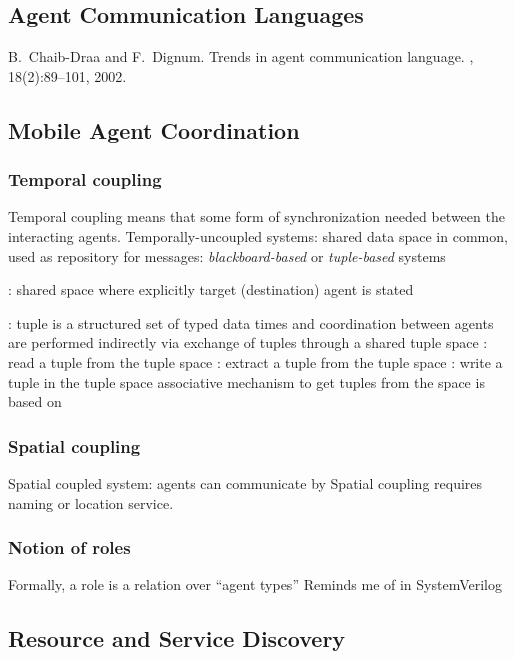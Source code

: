 \documentclass{myproc}
\begin{document}
\subsection{\textcolor{red2}{\bf{}Agent Communication Languages}}
\bit
\w B.~Chaib-Draa and F.~Dignum.
\newblock Trends in agent communication language.
, 18(2):89--101, 2002.
\eit

\subsection{\textcolor{red2}{\bf{}Mobile Agent Coordination}}
\subsubsection{Temporal coupling}
\bit
\w Temporal coupling means that some form of synchronization needed between
the interacting agents.
\w Temporally-uncoupled systems: shared data space in common, used as
repository for messages: {\em blackboard-based\/} or {\em tuple-based\/}
systems 

\w {}: shared space where explicitly target
  (destination) agent is stated

\w {}:  tuple is a structured set of
  typed data times and coordination between agents are performed indirectly
  via exchange of tuples through a shared tuple space
  \bit
  \w {}
    \bit
    \w {}: read a tuple from the tuple space
    \w {}: extract a tuple from the tuple space
    \w {}: write a tuple in the tuple space
    \eit
  \w associative mechanism to get tuples from the space is based on
  \eit
\eit

\subsubsection{Spatial coupling}
\bit
\w Spatial coupled system: agents can communicate by 
\w Spatial coupling requires naming or location service.
\eit

\subsubsection{Notion of roles}
\bit
\w Formally, a role is a relation over ``agent types''
\w Reminds me of  in SystemVerilog
\eit

\subsection{Resource and Service Discovery}
\end{document}
